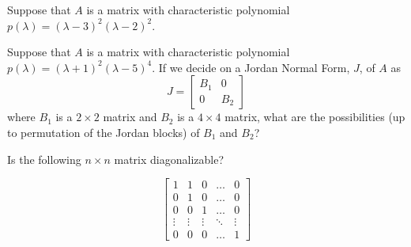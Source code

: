 \documentclass[11pt]{exam}
\begin{document}
\begin{questions}
\begin{parts}
\vfill









\end{parts}

\newpage
\addpoints
\question Suppose that $A$ is a matrix with characteristic polynomial $p(\lambda)=(\lambda -3)^2(\lambda-2)^2$. 

\newpage
\addpoints
\question[20] Suppose that $A$ is a matrix with characteristic polynomial $p(\lambda)=(\lambda +1)^2(\lambda-5)^4$. If we decide on a Jordan Normal Form, $J$, of $A$ as $$J= \begin{bmatrix}
B_1 & 0 \\
0 & B_2 
\end{bmatrix}$$ where $B_1$ is a $2 \times 2$ matrix and $B_2$ is a $4 \times 4$ matrix, what are the possibilities (up to permutation of the Jordan blocks) of $B_1$ and $B_2$?  

\newpage
\addpoints
\question[20]


Is the following $n \times n$ matrix diagonalizable?


$$
\begin{bmatrix}
    1 & 1 & 0 & \dots  & 0 \\
    0 & 1 & 0 & \dots  & 0 \\
    0 & 0 & 1 & \dots & 0 \\
    \vdots & \vdots & \vdots & \ddots & \vdots \\
    0 & 0 & 0 & \dots  & 1
\end{bmatrix}
$$

\end{questions}
\end{document}
